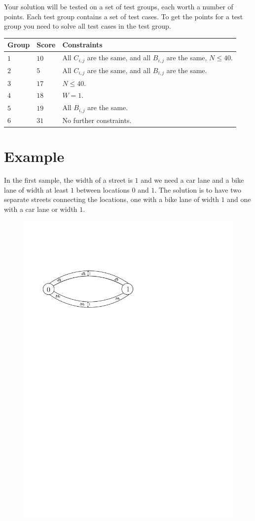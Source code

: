 \noindent
Your solution will be tested on a set of test groups, each worth a number of points. 
Each test group contains a set of test cases. To get the points for a test group you need to 
solve all test cases in the test group.

\noindent
\begin{tabular}{| l | l | p{12cm} |}
  \hline
  Group & Score & Constraints \\ \hline
  $1$   & $10$      & All $C_{i,j}$ are the same, and all $B_{i,j}$ are the same, $N \leq 40$.\\ \hline
  $2$   & $5$       & All $C_{i,j}$ are the same, and all $B_{i,j}$ are the same.\\ \hline
  $3$   & $17$      & $N\le 40$.\\ \hline
  $4$   & $18$      & $W = 1$.\\ \hline
  $5$   & $19$      & All $B_{i,j}$ are the same. \\ \hline
  $6$   & $31$      & No further constraints.  \\ \hline

\end{tabular}

\section*{Example}

In the first sample, the width of a street is $1$ and we need a car lane and a bike lane of width at least $1$ between locations $0$ and $1$. 
The solution is to have two separate streets connecting the locations, one with a bike lane of width $1$ and one with a car lane or width $1$.

\begin{figure}[h]
  \centering
  \includegraphics[width=.8\textwidth]{sample_small.pdf}
\end{figure}

